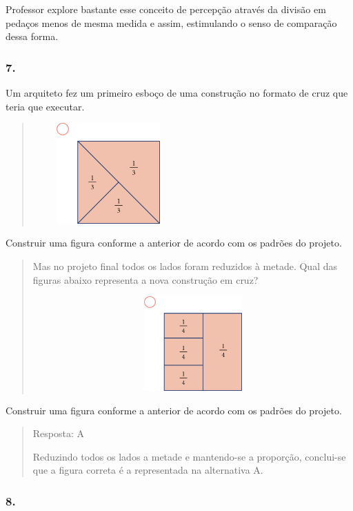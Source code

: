Professor explore bastante esse conceito de percepção através da divisão
em pedaços menos de mesma medida e assim, estimulando o senso de
comparação dessa forma.

\subsubsection{7.}\label{section-58}

Um arquiteto fez um primeiro esboço de uma construção no formato de cruz
que teria que executar.

\begin{quote}
\includegraphics[width=2.27520in,height=1.51680in]{media/image66.png}
\end{quote}

Construir uma figura conforme a anterior de acordo com os padrões do
projeto.

\begin{quote}
Mas no projeto final todos os lados foram reduzidos à metade. Qual das
figuras abaixo representa a nova construção em cruz?

\includegraphics[width=5.90556in,height=1.42639in]{media/image67.png}
\end{quote}

Construir uma figura conforme a anterior de acordo com os padrões do
projeto.

\begin{quote}
Resposta: A

Reduzindo todos os lados a metade e mantendo-se a proporção, conclui-se
que a figura correta é a representada na alternativa A.
\end{quote}

\subsubsection{8.}\label{section-59}

